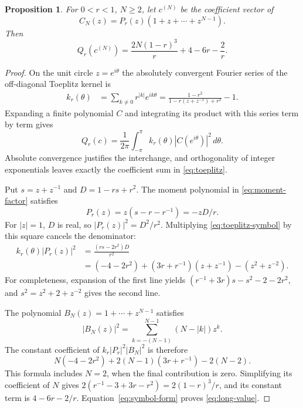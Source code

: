 \documentclass[11pt,letterpaper]{article}
\newtheorem{proposition}[theorem]{Proposition}
\theoremstyle{definition}
\theoremstyle{remark}
\begin{document}
\begin{proposition}
\label{prop:packet-formula}
For $0<r<1$, $N\geq2$, let $c^{(N)}$ be the coefficient
vector of
\begin{equation}
 C_N(z)=P_r(z)(1+z+\cdots+z^{N-1}).
 \label{eq:long-packet}
\end{equation}
Then
\begin{equation}
 Q_r(c^{(N)})=\frac{2N(1-r)^3}{r}+4-6r-\frac2r.
 \label{eq:long-value}
\end{equation}
\end{proposition}
\begin{proof}
On the unit circle $z=e^{i\theta}$ the absolutely convergent
Fourier series of the off-diagonal Toeplitz kernel is
\begin{align}
 k_r(\theta)
 &=\sum_{k\ne0}r^{|k|}e^{ik\theta}
 =\frac{1-r^2}{1-r(z+z^{-1})+r^2}-1.
 \label{eq:toeplitz-symbol}
\end{align}
Expanding a finite polynomial $C$ and integrating its product
with this series term by term gives
\begin{equation}
 Q_r(c)=\frac1{2\pi}\int_{-\pi}^{\pi}
 k_r(\theta)|C(e^{i\theta})|^2\,d\theta.
 \label{eq:symbol-form}
\end{equation}
Absolute convergence justifies the interchange, and
orthogonality of integer exponentials leaves exactly the
coefficient sum in \eqref{eq:toeplitz}.

Put $s=z+z^{-1}$ and $D=1-rs+r^2$. The moment polynomial
in \eqref{eq:moment-factor} satisfies
\[
 P_r(z)=z(s-r-r^{-1})=-zD/r.
\]
For $|z|=1$, $D$ is real, so $|P_r(z)|^2=D^2/r^2$.
Multiplying \eqref{eq:toeplitz-symbol} by this square cancels
the denominator:
\begin{align}
 k_r(\theta)|P_r(z)|^2
 &=\frac{(rs-2r^2)D}{r^2}\\
 &=(-4-2r^2)+(3r+r^{-1})(z+z^{-1})-(z^2+z^{-2}).
 \label{eq:laurent-cancellation}
\end{align}
For completeness, expansion of the first line yields
$(r^{-1}+3r)s-s^2-2-2r^2$, and
$s^2=z^2+2+z^{-2}$ gives the second line.

The polynomial $B_N(z)=1+\cdots+z^{N-1}$ satisfies
\[
 |B_N(z)|^2=\sum_{k=-(N-1)}^{N-1}(N-|k|)z^k.
\]
The constant coefficient of
$k_r|P_r|^2|B_N|^2$ is therefore
\[
 N(-4-2r^2)+2(N-1)(3r+r^{-1})-2(N-2).
\]
This formula includes $N=2$, when the final contribution is
zero. Simplifying its coefficient of $N$ gives
$2(r^{-1}-3+3r-r^2)=2(1-r)^3/r$, and its constant term
is $4-6r-2/r$. Equation~\eqref{eq:symbol-form} proves
\eqref{eq:long-value}.
\end{proof}
\end{document}
